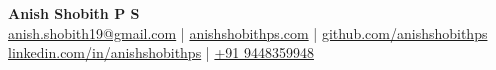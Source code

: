 \begin{center}
    \Huge \textbf{Anish Shobith P S} \\[5pt]
    \large
        \href{mailto:anish.shobith19@gmail.com}{anish.shobith19@gmail.com} |
        \href{https://anishshobithps.com}{anishshobithps.com} |
        \href{https://github.com/anishshobithps}{github.com/anishshobithps} \\[5pt]
        \href{https://www.linkedin.com/in/anishshobithps}{linkedin.com/in/anishshobithps} |
        \href{tel:+919448359948}{+91 9448359948}
    \normalsize
\end{center}
